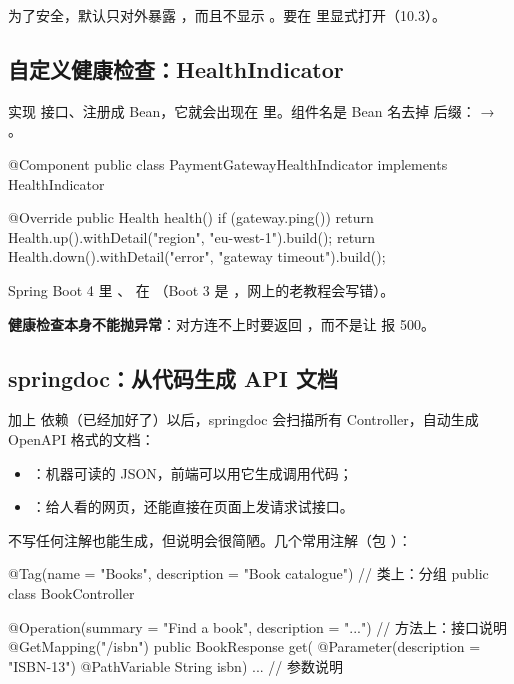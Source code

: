为了安全，默认只对外暴露 ，而且不显示 。要在  里显式打开（10.3）。

\subsection{自定义健康检查：HealthIndicator}

实现  接口、注册成 Bean，它就会出现在  里。组件名是 Bean 名去掉  后缀： → 。

\begin{java}
@Component
public class PaymentGatewayHealthIndicator implements HealthIndicator {

    @Override
    public Health health() {
        if (gateway.ping()) {
            return Health.up().withDetail("region", "eu-west-1").build();
        }
        return Health.down().withDetail("error", "gateway timeout").build();
    }
}
\end{java}

\begin{note}[包名]
Spring Boot 4 里 、 在 （Boot 3 是 ，网上的老教程会写错）。
\end{note}

\textbf{健康检查本身不能抛异常}：对方连不上时要返回 ，而不是让  报 500。

\subsection{springdoc：从代码生成 API 文档}

加上  依赖（已经加好了）以后，springdoc 会扫描所有 Controller，自动生成 OpenAPI 格式的文档：

\begin{itemize}
  \item {}：机器可读的 JSON，前端可以用它生成调用代码；
  \item {}：给人看的网页，还能直接在页面上发请求试接口。
\end{itemize}

不写任何注解也能生成，但说明会很简陋。几个常用注解（包 ）：

\begin{java}
@Tag(name = "Books", description = "Book catalogue")          // 类上：分组
public class BookController {

    @Operation(summary = "Find a book", description = "...")   // 方法上：接口说明
    @GetMapping("/{isbn}")
    public BookResponse get(
            @Parameter(description = "ISBN-13") @PathVariable String isbn) { ... }   // 参数说明
}
\end{java}

